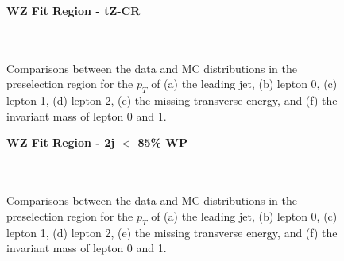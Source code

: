 \begin{figure}[H]
    \centering
    \textbf{WZ Fit Region - tZ-CR}\\
    \\
    \\
    \caption{Comparisons between the data and MC distributions in the preselection region for the $p_T$ of (a) the leading jet, (b) lepton 0, (c) lepton 1, (d) lepton 2, (e) the missing transverse energy, and (f) the invariant mass of lepton 0 and 1.}
    \label{kin:tZ_CR_1j}
\end{figure}

\begin{figure}[H]
    \centering
    \textbf{WZ Fit Region - 2j $<$ 85\% WP}\\
    \\
    \\
    \caption{Comparisons between the data and MC distributions in the preselection region for the $p_T$ of (a) the leading jet, (b) lepton 0, (c) lepton 1, (d) lepton 2, (e) the missing transverse energy, and (f) the invariant mass of lepton 0 and 1.}
    \label{kin:WP_2j_not85}
\end{figure}

